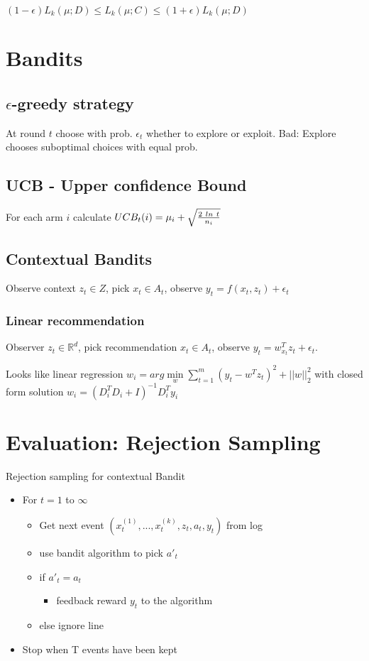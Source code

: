 \documentclass[a4paper,11pt,twocolumn]{article}
\begin{document}
$(1-\epsilon)L_k(\mu;D) \leq 
L_k(\mu;C) \leq
(1+\epsilon)L_k(\mu;D)$

\section{Bandits}

\subsection{$\epsilon$-greedy strategy}
At round $t$ choose with prob. $\epsilon_t$ whether to explore or exploit. Bad: Explore chooses suboptimal choices with equal prob.

\subsection{UCB - Upper confidence Bound}
For each arm $i$ calculate $UCB_t(i) = 
\mu_i + 
\sqrt{{2~ln~t} \over n_i}$	

\subsection{Contextual Bandits}
Observe context $z_t \in Z$, pick $x_t \in A_t$, observe $y_t = f(x_t, z_t) + \epsilon_t$

\subsubsection{Linear recommendation}
Observer $z_t \in \mathbb{R}^d$, pick recommendation $x_t \in A_t$, observe $y_t = w_{x_t}^T z_t + \epsilon_t$.

Looks like linear regression 
$w_i = arg \min \limits_w \sum \limits_{t=1}^m (y_t - w^T z_t)^2 + ||w||_2^2$ 
with closed form solution $w_i = (D_i^T D_i + I)^{-1} D_i^T y_i$

\section{Evaluation: Rejection Sampling}
Rejection sampling for contextual Bandit
\begin{itemize}[noitemsep,topsep=0pt,parsep=0pt,partopsep=0pt]
\item For $t=1$ to $\infty$
\begin{itemize}[noitemsep,topsep=0pt,parsep=0pt,partopsep=0pt]
\item Get next event $(x_t^{(1)},...,x_t^{(k)},z_t,a_t,y_t)$ from log
\item use bandit algorithm to pick $a'_t$
\item if $a'_t = a_t$

\begin{itemize}[noitemsep,topsep=0pt,parsep=0pt,partopsep=0pt]
\item feedback reward $y_t$ to the algorithm
\end{itemize}

\item else ignore line
\end{itemize}
\item Stop when T events have been kept
\end{itemize}
\end{document}
